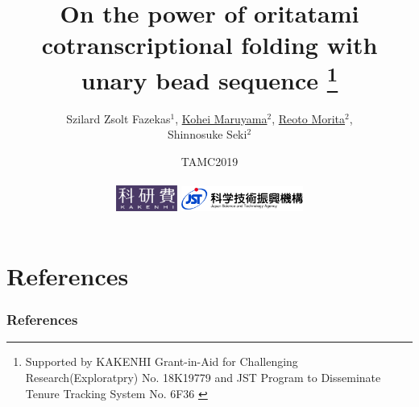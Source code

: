 \documentclass[11pt]{beamer}
\title{On the power of oritatami cotranscriptional folding with unary bead sequence
\footnote[0]{
{ \tiny
	Supported by KAKENHI Grant-in-Aid for Challenging Research(Exploratpry) No. 18K19779
and JST Program to Disseminate Tenure Tracking System No. 6F36
}
}}
\date{TAMC2019 \\ \  \\
\includegraphics[width=0.15\textwidth]{fig/whiteKAKENHIlogoM_jp.jpg}
\includegraphics[width=0.3\textwidth]{fig/jstlogo_sample.png}
}
\author{Szilard Zsolt Fazekas${}^1$, \underline{Kohei Maruyama${}^2$}, \underline{Reoto Morita${}^2$}, \\Shinnosuke Seki${}^2$}
\institute{${}^1$Akita University, ${}^2$University of Electro-Communications}
\begin{document}
\begin{frame}\frametitle{}
 \titlepage
\end{frame}









\section{References}
\begin{frame}[t, allowframebreaks]\frametitle{References}

\end{frame}
\end{document}

